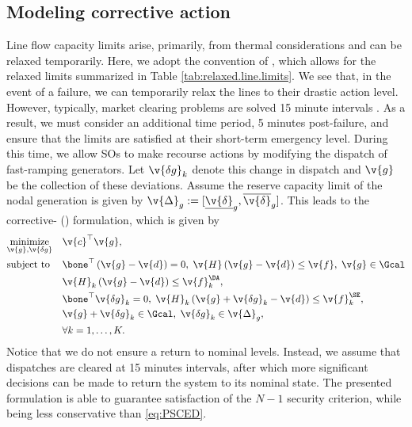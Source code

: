 \subsection{Modeling corrective action}
Line flow capacity limits arise, primarily, from thermal considerations and can be relaxed temporarily. Here, we adopt the convention of \cite{national2010transmission}, which allows for the relaxed limits summarized in Table \ref{tab:relaxed.line.limits}. We see that, in the event of a failure, we can temporarily relax the lines to their drastic action level. However, typically, market clearing problems are solved 15 minute intervals \addcite. As a result, we must consider an additional time period, 5 minutes post-failure, and ensure that the limits are satisfied at their short-term emergency level. During this time, we allow SOs to make recourse actions by modifying the dispatch of fast-ramping generators. Let $\v{\delta g}_k$ denote this change in dispatch and $\v{g}$ be the collection of these deviations. Assume the reserve capacity limit of the nodal generation is given by $\v{\Delta}_g := [\underline{\v{\delta}}_g, \overline{\v{\delta}}_g]$.
%
%
%
This leads to the corrective-\SCED{} (\CSCED{}) formulation, which is given by
\begin{subequations}
\begin{align}
    &\underset{\v{g}, \v{\delta g}}{\text{minimize}} && \v{c}^\top \v{g}, \label{eq:CSCED.obj} \\
    &\text{subject to} && \bone^\top \left(\v{g} - \v{d}\right) = 0, \; \v{H} \left( \v{g} - \v{d} \right) \le \v{f}, \; \v{g} \in \Gcal \label{eq:CSCED.nominal} \\
    &&& \v{H}_k \left( \v{g} - \v{d} \right) \le \v{f}_k^{\DA}, \label{eq:CSCED.da} \\
    &&& \bone^\top \v{\delta g}_k = 0, \; \v{H}_k \left( \v{g} + \v{\delta g}_k - \v{d} \right) \le \v{f}_k^{\SE}, \label{eq:CSCED.se} \\
    &&& \v{g} + \v{\delta g}_k \in \Gcal, \; \v{\delta g}_k \in \v{\Delta}_g, \label{eq:CSCED.se.gen} \\
    &&& \forall k = 1, \dots, K.
\end{align}
\label{eq:CSCED}
\end{subequations}
Notice that we do not ensure a return to nominal levels. Instead, we assume that dispatches are cleared at 15 minutes intervals, after which more significant decisions can be made to return the system to its nominal state. The presented formulation is able to guarantee satisfaction of the $N-1$ security criterion, while being less conservative than \eqref{eq:PSCED}.

